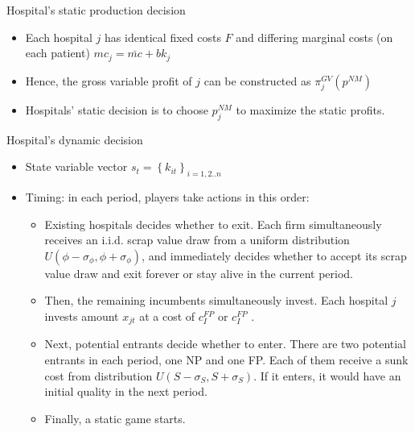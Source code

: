 \documentclass[aspectratio=169]{beamer}  %
\begin{document}
\begin{frame}{Hospital's static production decision}
    \begin{itemize}
        \item  Each hospital $j$ has identical fixed costs $F$ and differing marginal costs (on each patient) $mc_j=\bar{mc}+bk_j $
        \item Hence, the gross variable profit of $j$ can be constructed as $\pi_j^{GV}(p^{NM})$
        \item Hospitals' static decision is to choose $p_j^{NM}$ to maximize the static profits. 
    
        
    \end{itemize}

\end{frame}

\begin{frame}{Hospital's dynamic decision}
    \begin{itemize}
        \item  State variable vector $s_t=\left\{k_{it}\right\}_{i=1,2..n}$
        \item Timing: in each period, players take actions in this order: 
            \begin{itemize}
                \item Existing hospitals decides whether to exit. Each firm simultaneously receives an i.i.d. scrap value draw from a uniform distribution $U(\phi-\sigma_{\phi},\phi+\sigma_{\phi})$, and immediately decides whether to accept its scrap value draw and exit forever or stay alive in the current period.
                \item Then, the remaining incumbents simultaneously invest. Each hospital $j$ invests amount $x_{jt}$ at a cost of $c_I^{FP}$ or $c_I^{FP}$ .
                \item Next, potential entrants decide whether to enter. There are two potential entrants in each period, one NP and one FP. Each of them receive a sunk cost from distribution $U(S-\sigma_{S},S+\sigma_{S})$. If it enters, it would have an initial quality in the next period.
                \item Finally, a static game starts.
            \end{itemize}
        
    \end{itemize}

\end{frame}
\end{document}
